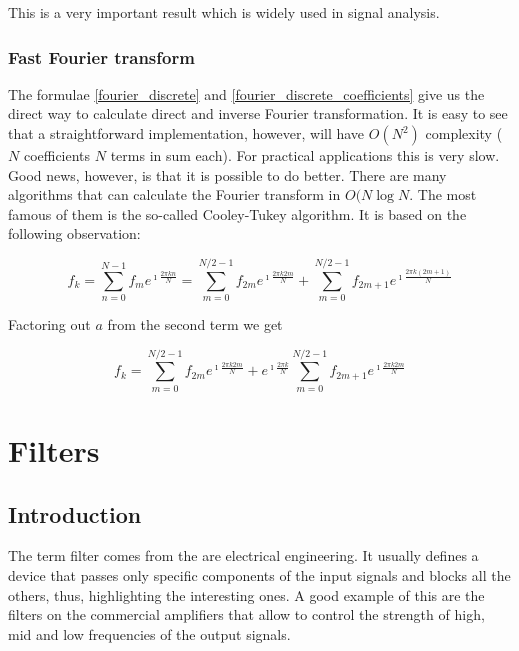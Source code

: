 \documentclass[11pt]{book}
\begin{document}
This is a very important result which is widely used in signal analysis. 

\subsubsection{Fast Fourier transform}

The formulae \eqref{fourier_discrete} and \eqref{fourier_discrete_coefficients} give us the direct way to calculate direct and inverse Fourier transformation. It is easy to see that a straightforward implementation, however, will have $O(N^2)$ complexity ( $N$ coefficients $N$ terms in sum each). For practical applications this is very slow. Good news, however, is that it is possible to do better. There are many algorithms that can calculate the Fourier transform in $O(N\operatorname{log}{N}$. The most famous of them is the so-called Cooley-Tukey algorithm. It is based on the following observation:


\begin{equation}
f_k = \sum\limits_{n=0}^{N-1} f_{m} e^{\imath \frac{2 \pi k n}{N}} = \sum\limits_{m=0}^{N/2 -1} f_{2m} e^{\imath \frac{2 \pi k 2 m}{N}} + \sum\limits_{m = 0}^{N / 2-1} f_{2m+1} e^{\imath \frac{2 \pi k (2 m + 1)}{N}}
\end{equation}

Factoring out $a$ from the second term we get

\begin{equation}
f_k =  \sum\limits_{m=0}^{N/2 -1} f_{2m} e^{\imath \frac{2 \pi k 2 m}{N}} + e^{\imath \frac{2 \pi k}{N}}\sum\limits_{m = 0}^{N / 2 - 1} f_{2m+1} e^{\imath \frac{2 \pi k 2 m }{N}}
\end{equation}








\section{Filters}

\subsection{Introduction}

The term filter comes from the are electrical engineering. It usually defines a device that passes only specific components of the input signals and blocks all the others, thus, highlighting the interesting ones. A good example of this are the filters on the commercial amplifiers that allow to control the strength of high, mid and low frequencies of the output signals.
\end{document}
